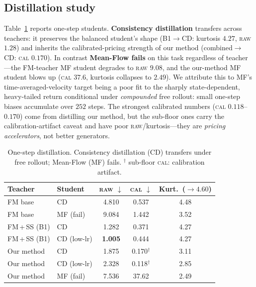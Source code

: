 \documentclass[11pt]{article}
\newcommand{\raw}{\textsc{raw}}
\renewcommand{\cal}{\textsc{cal}}
\newcommand{\best}[1]{\textbf{#1}}
\begin{document}
\subsection{Distillation study}
\label{sec:results-distill}
Table~\ref{tab:distill} reports one-step students. \textbf{Consistency
distillation} transfers across teachers: it preserves the balanced student's shape
(B1$\to$CD: kurtosis $4.27$, \raw{} $1.28$) and inherits the calibrated-pricing
strength of our method (combined$\to$CD: \cal{} $0.170$). In contrast
\textbf{Mean-Flow fails} on this task regardless of teacher---the FM-teacher MF
student degrades to \raw{} $9.08$, and the our-method MF student blows up
(\cal{} $37.6$, kurtosis collapses to $2.49$). We attribute this to MF's
time-averaged-velocity target being a poor fit to the sharply state-dependent,
heavy-tailed return conditional under \emph{compounded} free rollout: small
one-step biases accumulate over $252$ steps. The strongest calibrated numbers
(\cal{} $0.118$--$0.170$) come from distilling our method, but the sub-floor ones
carry the calibration-artifact caveat and have poor \raw{}/kurtosis---they are
\emph{pricing accelerators}, not better generators.

\begin{table}[t]
\centering
\caption{One-step distillation. Consistency distillation (CD) transfers under free
rollout; Mean-Flow (MF) fails. $^{\dagger}$ sub-floor \cal{}: calibration artifact.}
\label{tab:distill}
\small
\begin{tabular}{l l c c c}
\toprule
Teacher & Student & \raw{} $\downarrow$ & \cal{} $\downarrow$ & Kurt.\ ($\to 4.60$) \\
\midrule
FM base        & CD & 4.810 & 0.537 & 4.48 \\
FM base        & MF (fail) & 9.084 & 1.442 & 3.52 \\
FM\,+\,SS (B1) & CD & 1.282 & 0.371 & 4.27 \\
FM\,+\,SS (B1) & CD (low-lr)  & \best{1.005} & 0.444 & 4.27 \\
Our method     & CD & 1.875 & 0.170$^{\dagger}$ & 3.11 \\
Our method     & CD (low-lr)  & 2.328 & 0.118$^{\dagger}$ & 2.85 \\
Our method     & MF (fail) & 7.536 & 37.62 & 2.49 \\
\bottomrule
\end{tabular}
\end{table}
\end{document}
